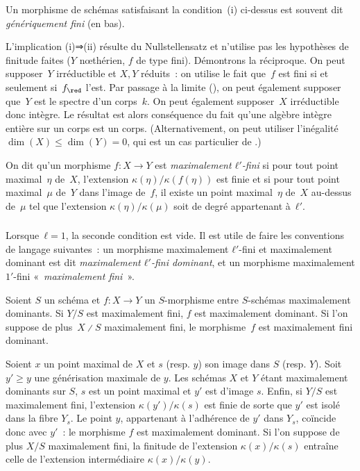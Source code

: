 \documentclass[10pt]{../fichiers-configuration-latex/smfart}
\begin{document}
Un morphisme de schémas satisfaisant la condition (i)
ci-dessus est souvent dit \emph{génériquement fini} (en bas).

\begin{démo}
L'implication (i)⇒(ii) résulte du Nullstellensatz
et n'utilise pas les hypothèses de finitude faites ($Y$ nœthérien, $f$ de type fini).
Démontrons la réciproque. On peut supposer $Y$ irréductible et $X,Y$ réduits : on utilise le fait que $f$ est
fini si et seulement si $f_{\red}$ l'est. Par passage à la limite
(), on peut également supposer
que $Y$ est le spectre d'un corps $k$. On peut également
supposer $X$ irréductible donc intègre. Le résultat
est alors conséquence du fait qu'une algèbre intègre
entière sur un corps est un corps.
(Alternativement, on peut utiliser
l'inégalité $\dim(X)≤\dim(Y)=0$,
qui est un cas particulier de .)
\end{démo}

\begin{définition2}\label{2-L-maximalement fini}
On dit qu'un morphisme $f:X → Y$ est \emph{maximalement $ℓ′$-fini}
si pour tout point maximal $η$ de $X$, l'extension $κ(η)/κ(f(η))$
est finie et si pour tout point maximal $μ$ de $Y$ dans l'image de $f$,
il existe un point maximal $η$ de $X$ au-dessus de $μ$
tel que l'extension $κ(η)/κ(μ)$ soit de degré appartenant à $ℓ′$.
\end{définition2}

\subsubsection{}Lorsque $ℓ=1$, la seconde condition est vide.
Il est utile de faire les conventions de langage suivantes :
un morphisme maximalement $ℓ′$-fini et maximalement dominant
est dit \emph{maximalement $ℓ′$-fini dominant},
et un morphisme maximalement $1′$-fini « \emph{maximalement fini} ».

\begin{proposition2}\label{2-morphisme entre maximalement dominants gen finis}
Soient $S$ un schéma et $f:X→Y$ un $S$-morphisme entre $S$-schémas
maximalement dominants.
Si $Y/S$ est maximalement fini, $f$ est maximalement dominant.
Si l'on suppose de plus $X ∕ S$ maximalement fini, le morphisme $f$ est maximalement fini dominant.
\end{proposition2}


\begin{démo}
Soient $x$ un point maximal de $X$ et $s$ (resp. $y$) son image dans $S$
(resp. $Y$). Soit $y'≥y$ une générisation maximale de $y$. Les schémas
$X$ et $Y$ étant maximalement dominants sur $S$, $s$ est un point maximal et $y'$
est d'image $s$. Enfin, si $Y/S$ est maximalement fini, 
l'extension $κ(y')/κ(s)$ est finie de sorte que $y'$ est isolé dans la
fibre $Y_s$. Le point $y$, appartenant à l'adhérence de $y'$ dans
$Y_s$, coïncide donc avec $y'$ : le morphisme $f$ est maximalement dominant.
Si l'on suppose de plus $X/S$ maximalement fini,
la finitude de l'extension $κ(x)/κ(s)$ entraîne celle de l'extension
intermédiaire $κ(x)/κ(y)$.
\end{démo}
\end{document}
